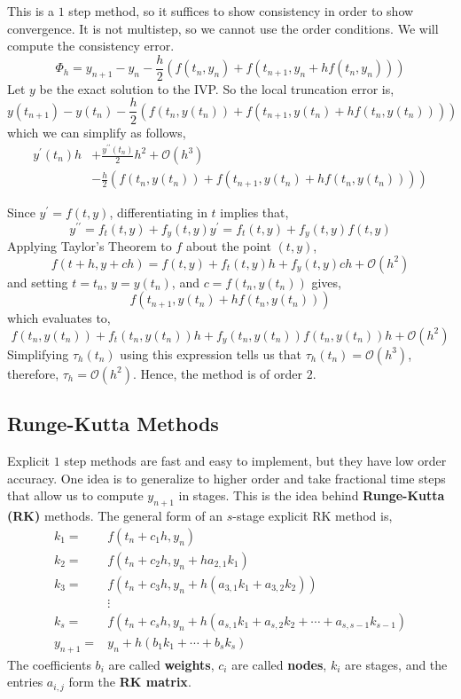 \noindent This is a $1$ step method, so it suffices to show consistency in order to show convergence. It is not multistep, so we cannot use the order conditions. We will compute the consistency error.
\[\Phi_h=y_{n+1}-y_n-\frac{h}{2}\left(f\left(t_n, y_n\right)+f\left(t_{n+1}, y_n+h f\left(t_n, y_n\right)\right)\right)\]
Let $y$ be the exact solution to the IVP. So the local truncation error is,
\[y\left(t_{n+1}\right)-y\left(t_n\right)-\frac{h}{2}\left(f\left(t_n, y\left(t_n\right)\right)+f\left(t_{n+1}, y\left(t_n\right)+h f\left(t_n, y\left(t_n\right)\right)\right)\right)\]
which we can simplify as follows,
\begin{align*}
	y^{\prime}\left(t_n\right) h &+\frac{y^{\prime \prime}\left(t_n\right)}{2} h^2+\mathcal{O}\left(h^3\right) \\
	&- \frac{h}{2}\left(f\left(t_n, y\left(t_n\right)\right)+f\left(t_{n+1}, y\left(t_n\right)+h f\left(t_n, y\left(t_n\right)\right)\right)\right)
\end{align*}

Since $y^{\prime}=f(t, y)$, differentiating in $t$ implies that,
\[y^{\prime \prime}=f_t(t, y)+f_y(t, y) y^{\prime}=f_t(t, y)+f_y(t, y) f(t, y)\]
Applying Taylor's Theorem to $f$ about the point $(t, y)$,
\[f(t+h, y+c h)=f(t, y)+f_t(t, y) h+f_y(t, y) c h+\mathcal{O}(h^2)\]
and setting $t = t_n$, $y = y(t_n)$, and $c = f(t_n, y(t_n))$ gives,
\[f\left(t_{n+1}, y\left(t_n\right)+h f\left(t_n, y\left(t_n\right)\right)\right)\]
which evaluates to,
\[f\left(t_n, y\left(t_n\right)\right)+f_t\left(t_n, y\left(t_n\right)\right) h+f_y\left(t_n, y\left(t_n\right)\right) f\left(t_n, y\left(t_n\right)\right) h+\mathcal{O}(h^2)\]
Simplifying $\tau_h\left(t_n\right)$ using this expression tells us that $\tau_h\left(t_n\right)=\mathcal{O}(h^3)$, therefore, $\tau_h=\mathcal{O}(h^2)$. Hence, the method is of order $2$.

\subsection{Runge-Kutta Methods}
Explicit $1$ step methods are fast and easy to implement, but they have low order accuracy. One idea is to generalize to higher order and take fractional time steps that allow us to compute $y_{n+1}$ in stages. This is the idea behind \textbf{Runge-Kutta (RK)} methods. The general form of an $s$-stage explicit RK method is,
\begin{align*}
k_1=& f\left(t_n+c_1 h, y_n\right) \\
k_2=& f\left(t_n+c_2 h, y_n+h a_{2,1} k_1\right) \\
k_3=& f\left(t_n+c_3 h, y_n+h\left(a_{3,1} k_1+a_{3,2} k_2\right)\right) \\
& \vdots \\
k_s=& f\left(t_n+c_s h, y_n+h\left(a_{s, 1} k_1+a_{s, 2} k_2+\cdots+a_{s, s-1} k_{s-1}\right)\right.\\
y_{n+1}=& y_n+h\left(b_1 k_1+\cdots+b_s k_s\right)
\end{align*}
The coefficients $b_i$ are called \textbf{weights}, $c_i$ are called \textbf{nodes}, $k_i$ are stages, and the entries $a_{i,j}$ form the \textbf{RK matrix}.


